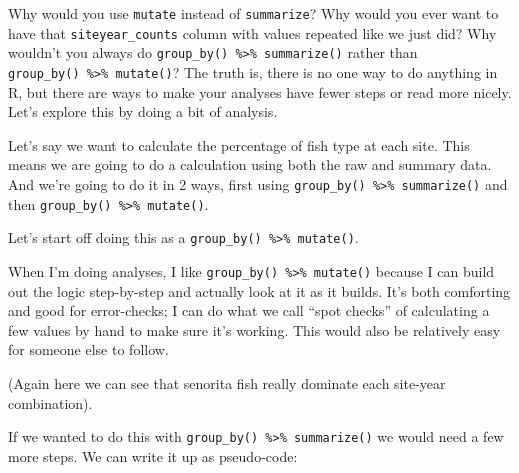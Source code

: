 \documentclass[]{book}
\newenvironment{Shaded}{\begin{snugshade}}{\end{snugshade}}
\newcommand{\DataTypeTok}[1]{\textcolor[rgb]{0.13,0.29,0.53}{#1}}
\newcommand{\DecValTok}[1]{\textcolor[rgb]{0.00,0.00,0.81}{#1}}
\newcommand{\KeywordTok}[1]{\textcolor[rgb]{0.13,0.29,0.53}{\textbf{#1}}}
\newcommand{\NormalTok}[1]{#1}
\newcommand{\OperatorTok}[1]{\textcolor[rgb]{0.81,0.36,0.00}{\textbf{#1}}}
\newcommand{\StringTok}[1]{\textcolor[rgb]{0.31,0.60,0.02}{#1}}
\begin{document}
Why would you use \texttt{mutate} instead of \texttt{summarize}? Why would you ever want to have that \texttt{siteyear\_counts} column with values repeated like we just did? Why wouldn't you always do \texttt{group\_by()\ \%\textgreater{}\%\ summarize()} rather than \texttt{group\_by()\ \%\textgreater{}\%\ mutate()}? The truth is, there is no one way to do anything in R, but there are ways to make your analyses have fewer steps or read more nicely. Let's explore this by doing a bit of analysis.

Let's say we want to calculate the percentage of fish type at each site. This means we are going to do a calculation using both the raw and summary data. And we're going to do it in 2 ways, first using \texttt{group\_by()\ \%\textgreater{}\%\ summarize()} and then \texttt{group\_by()\ \%\textgreater{}\%\ mutate()}.

Let's start off doing this as a \texttt{group\_by()\ \%\textgreater{}\%\ mutate()}.

\begin{Shaded}
\end{Shaded}

When I'm doing analyses, I like \texttt{group\_by()\ \%\textgreater{}\%\ mutate()} because I can build out the logic step-by-step and actually look at it as it builds. It's both comforting and good for error-checks; I can do what we call ``spot checks'' of calculating a few values by hand to make sure it's working. This would also be relatively easy for someone else to follow.

(Again here we can see that senorita fish really dominate each site-year combination).

If we wanted to do this with \texttt{group\_by()\ \%\textgreater{}\%\ summarize()} we would need a few more steps. We can write it up as pseudo-code:
\end{document}
